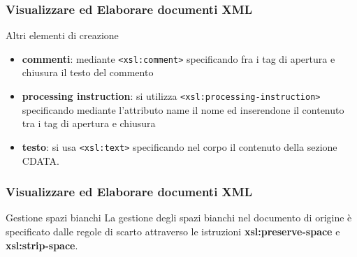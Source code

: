 \begin{frame}
    \frametitle{Visualizzare ed Elaborare documenti XML}
    \addtocounter{nframe}{1}
    

     \begin{block}{Altri elementi di creazione}
        \begin{itemize}
            \item \textbf{commenti}: mediante \texttt{<xsl:comment>} specificando fra i tag di apertura e chiusura il testo del commento
            \item \textbf{processing instruction}: si utilizza \texttt{<xsl:processing-instruction>} specificando mediante l’attributo name il nome ed inserendone il contenuto tra i tag di apertura e chiusura
            \item \textbf{testo}: si usa \texttt{<xsl:text>} specificando nel corpo il contenuto della sezione CDATA.
        \end{itemize}
     \end{block}

\end{frame}

\begin{frame}
    \frametitle{Visualizzare ed Elaborare documenti XML}
    \addtocounter{nframe}{1}
    

     \begin{block}{Gestione spazi bianchi}
        La gestione degli spazi bianchi nel documento di origine è specificato dalle regole di scarto attraverso le istruzioni \textbf{xsl:preserve-space} e \textbf{xsl:strip-space}.
     \end{block}

\end{frame}


